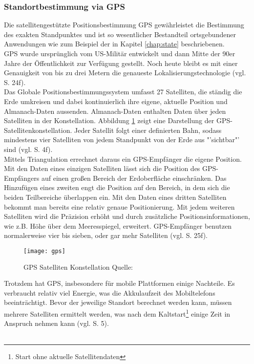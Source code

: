 \subsubsection{Standortbestimmung via \gls{GPS}}
Die satellitengestützte Positionsbestimmung \gls{GPS} gewährleistet die Bestimmung des exakten Standpunktes und ist so wesentlicher Bestandteil ortsgebundener Anwendungen wie zum Beispiel der in Kapitel \ref{chap:state} beschriebenen. \\
\gls{GPS} wurde ursprünglich vom US-Militär entwickelt und dann Mitte der 90er Jahre der Öffentlichkeit zur Verfügung gestellt. Noch heute bleibt es mit einer Genauigkeit von bis zu drei Metern die genaueste Lokalisierungstechnologie (vgl. \cite{gps} S. 24f).\\
Das Globale Positionsbestimmungssystem umfasst 27 Satelliten, die ständig die Erde umkreisen und dabei kontinuierlich ihre eigene, aktuelle Position und Almanach-Daten aussenden. Almanach-Daten enthalten Daten über jeden Satelliten in der Konstellation. Abbildung \ref{fig:gps} zeigt eine Darstellung der GPS-Satellitenkonstellation. Jeder Satellit folgt einer definierten Bahn, sodass mindestens vier Satelliten von jedem Standpunkt von der Erde aus "'sichtbar"' sind (vgl. \cite{location} S. 4f).\\
Mittels Triangulation errechnet daraus ein \gls{GPS}-Empfänger die eigene Position. Mit den Daten eines einzigen Satelliten lässt sich die Position des \gls{GPS}-Empfängers auf einen großen Bereich der Erdoberfläche einschränken. Das Hinzufügen eines zweiten engt die Position auf den Bereich, in dem sich die beiden Teilbereiche überlappen ein. Mit den Daten eines dritten Satelliten bekommt man bereits eine relativ genaue Positionierung. Mit jedem weiteren Satelliten wird die Präzision erhöht und durch zusätzliche Positionsinformationen, wie z.B. Höhe über dem Meeresspiegel, erweitert. \gls{GPS}-Empfänger benutzen normalerweise vier bis sieben, oder gar mehr Satelliten (vgl. \cite{gps} S. 25f).\\
\begin{figure}[H]  
    \centering  
    \texttt{[image: gps]} 
    \grayRule
    \caption[GPS-Satelliten-Konstellation]{GPS Satelliten Konstellation  Quelle: \cite{fig:gps}}
    \label{fig:gps}
\end{figure}
Trotzdem hat \gls{GPS}, insbesondere für mobile Plattformen einige Nachteile. Es verbraucht relativ viel Energie, was die Akkulaufzeit des Mobiltelefons beeinträchtigt. Bevor der jeweilige Standort berechnet werden kann, müssen mehrere Satelliten ermittelt werden, was nach dem Kaltstart\footnote{ Start ohne aktuelle Satellitendaten} einige Zeit in Anspruch nehmen kann (vgl. \cite{location} S. 5).\\\\
